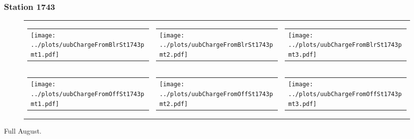 \documentclass[aspectratio=169]{beamer}
\begin{document}
\begin{frame} 
  \frametitle{Station 1743}
 
  \begin{figure}
    \centering
    \begin{tabularx}{\textwidth}{LCR}
      \begin{tabular}{l}
        \texttt{[image: ../plots/uubChargeFromBlrSt1743pmt1.pdf]}
      \end{tabular}
      &
      \begin{tabular}{l}
        \texttt{[image: ../plots/uubChargeFromBlrSt1743pmt2.pdf]}
      \end{tabular}
      &
      \begin{tabular}{l}
        \texttt{[image: ../plots/uubChargeFromBlrSt1743pmt3.pdf]}
      \end{tabular}
      \\
      \begin{tabular}{l}
        \texttt{[image: ../plots/uubChargeFromOffSt1743pmt1.pdf]}
      \end{tabular}
      &
      \begin{tabular}{l}
        \texttt{[image: ../plots/uubChargeFromOffSt1743pmt2.pdf]}
      \end{tabular}
      &
      \begin{tabular}{l}
        \texttt{[image: ../plots/uubChargeFromOffSt1743pmt3.pdf]}
      \end{tabular}
    \end{tabularx}
  \end{figure}
  Full August. 
\end{frame}
\end{document}
